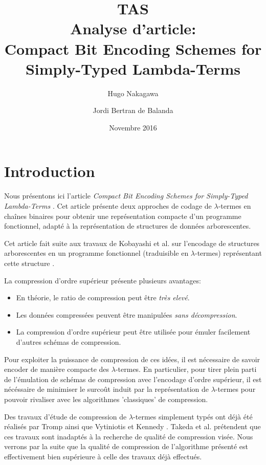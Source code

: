 \documentclass[titlepage]{article}
\title{TAS\\
Analyse d'article:\\
Compact Bit Encoding Schemes for Simply-Typed Lambda-Terms}
\author{Hugo Nakagawa \and Jordi Bertran de Balanda}
\date{Novembre 2016}
\providecommand{\tightlist}{%
  \setlength{\itemsep}{0pt}\setlength{\parskip}{0pt}}
\begin{document}
\maketitle
\newpage
{
\setcounter{tocdepth}{3}
\tableofcontents
}
\newpage

\section{Introduction}\label{introduction}

Nous présentons ici l'article \emph{Compact Bit Encoding Schemes for
Simply-Typed Lambda-Terms} \cite{takeda2016compact}. Cet article présente deux
approches de codage de \(\lambda\)-termes en chaînes binaires pour
obtenir une représentation compacte d'un programme fonctionnel, adapté à
la représentation de structures de données arborescentes.

Cet article fait suite aux travaux de Kobayashi et al. sur l'encodage de
structures arborescentes en un programme fonctionnel (traduisible
en \(\lambda\)-termes) représentant cette structure \cite{kobayashi2012functional}.

La compression d'ordre supérieur présente plusieurs avantages:

\begin{itemize}
\tightlist
\item
  En théorie, le ratio de compression peut être \emph{très elevé}.
\item
  Les données compressées peuvent être manipulées \emph{sans
  décompression}.
\item
  La compression d'ordre supérieur peut être utilisée pour émuler
  facilement d'autres schémas de compression.
\end{itemize}

Pour exploiter la puissance de compression de ces idées, il est
nécessaire de savoir encoder de manière compacte des \(\lambda\)-termes.
En particulier, pour tirer plein parti de l'émulation de schémas de compression
avec l'encodage d'ordre supérieur, il est nécéssaire de minimiser le surcoût
induit par la représentation de $\lambda$-termes pour pouvoir rivaliser avec
les algorithmes 'classiques' de compression.

Des travaux d'étude de compression de \(\lambda\)-termes
simplement typés ont déjà été réalisés par Tromp \cite{tromp2007binary} ainsi que
Vytiniotis et Kennedy \cite{vytiniotis2010functional, kennedy2012every}. Takeda et al.
prétendent que ces travaux sont inadaptés à la recherche de qualité de compression visée.
Nous verrons par la suite que la qualité de compression de l'algorithme présenté est
effectivement bien supérieure à celle des travaux déjà effectués.
\end{document}
